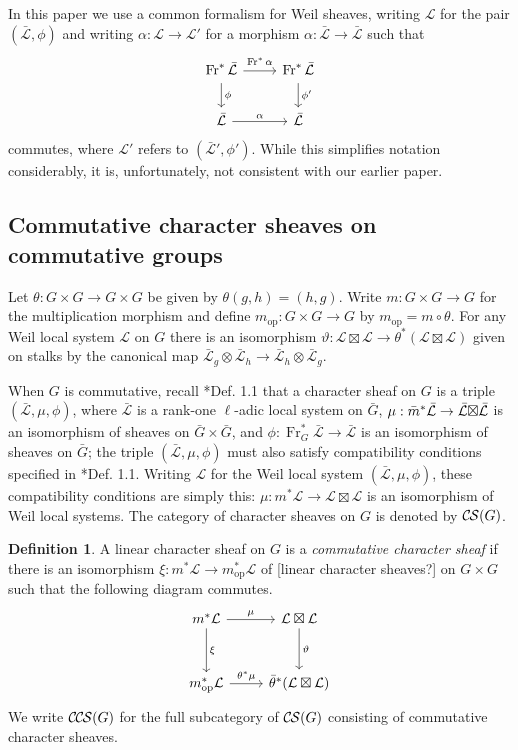 \documentclass[10pt]{amsart}
\theoremstyle{plain}
\theoremstyle{definition}
\newtheorem{definition}[theorem]{Definition}
\newcommand{\Frob}[1]{\operatorname{Fr}_{#1}}
\newcommand{\op}{_{\operatorname{op}}}
\newcommand{\cs}[1]{{\mathcal{#1}}}
\newcommand{\gcs}[1]{{\mathcal{\bar #1}}}
\newcommand{\CS}{{\mathcal{C\hskip-0.8pt S}}}
\newcommand{\CCS}{{\mathcal{C\hskip-.8pt C\hskip-0.8pt S}}}
\newcommand{\bm}{\bar{m}}
\newcommand{\bG}{\bar{G}}
\newcommand{\tight}[3]{\hspace{-#1pt}{#2}\hspace{-#3pt}}
\newcommand{\LxL}{\text{$\gcs{L} \tight{0}{\boxtimes}{0} \gcs{L}$}}
\begin{document}
In this paper we use a common formalism for Weil sheaves, writing $\cs{L}$ for the pair $(\gcs{L},\phi)$ and writing $\alpha : \cs{L} \to \cs{L}'$ for a morphism $\alpha : \gcs{L} \to \gcs{L}$ such that 
\[
\begin{tikzcd}
\Frob{}^* \gcs{L} \arrow{d}{\phi} \arrow{r}{\Frob{}^*\alpha} &  \Frob{}^* \gcs{L} \arrow{d}{\phi'}\\
\gcs{L} \arrow{r}{\alpha} & \gcs{L}
\end{tikzcd}
\]
commutes, where $\cs{L}'$ refers to $(\gcs{L}',\phi')$.
While this simplifies notation considerably, it is, unfortunately, not consistent with our earlier paper.



\subsection{Commutative character sheaves on commutative groups}

Let $\theta : G\times G \to G\times G$ be given by $\theta(g,h) = (h,g)$.
Write $m : G \times G \to G$ for the multiplication morphism
and define $m\op : G \times G \to G$ by $m\op = m \circ \theta$.
For any Weil local system $\cs{L}$ on $G$ there is an isomorphism
$\vartheta : \cs{L}\boxtimes\cs{L} \to \theta^*(\cs{L}\boxtimes\cs{L})$ given on stalks by the canonical map
$\gcs{L}_{g} \otimes \gcs{L}_{h} \to \gcs{L}_{h} \otimes \gcs{L}_{g}$.


When $G$ is commutative, recall \cite{cunningham-roe:13a}*{Def. 1.1} that a character sheaf on $G$ is a triple $(\gcs{L}, \mu, \phi)$,
where $\gcs{L}$ is a rank-one $\ell$-adic local system on $\bG$, 
$\mu : \bm^* \gcs{L} \to \LxL$ is an isomorphism
of sheaves on $\bG \times \bG$, 
and $\phi : \Frob{G}^* \gcs{L} \to \gcs{L}$ is an isomorphism of sheaves on $\bG$;
the triple $(\gcs{L}, \mu, \phi)$ must also satisfy compatibility conditions specified in \cite{cunningham-roe:13a}*{Def. 1.1}.
Writing $\cs{L}$ for the Weil local system $(\gcs{L}, \mu, \phi)$, these compatibility conditions are simply this: $\mu : m^*\cs{L} \to \cs{L}\boxtimes\cs{L}$ is an isomorphism of Weil local systems.
The category of character sheaves on $G$ is denoted by $\CS(G)$.


\begin{definition}\label{def:CCS}
A linear character sheaf on $G$ is a \emph{commutative character sheaf} if there is an isomorphism $\xi: m^* \cs{L} \to m\op^* \cs{L}$ of [linear character sheaves?] on $G\times G$ such that the following diagram commutes.
  \[
  \begin{tikzcd}[row sep=30]
   m^*\cs{L} \arrow{d}{\xi} \arrow{r}{\mu} & \cs{L}\boxtimes\cs{L} \arrow{d}{\vartheta}\\
   m\op^*\cs{L} \arrow{r}{{\theta}^*\mu} &  {\bar \theta}^*(\cs{L}\boxtimes\cs{L})
  \end{tikzcd}
  \]
We write $\CCS(G)$ for the full subcategory of $\CS(G)$ consisting of commutative character sheaves.
 \end{definition}
\end{document}
